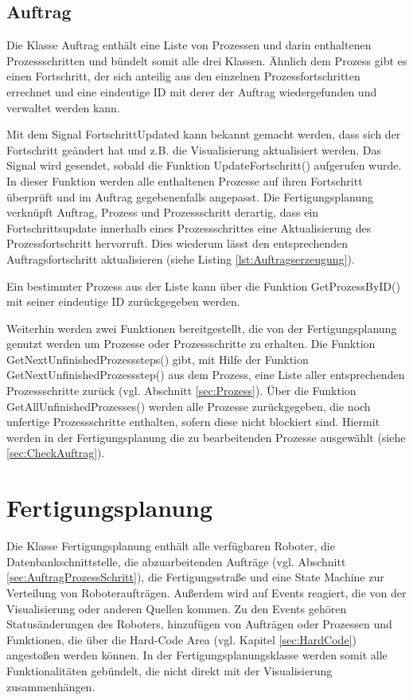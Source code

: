 \subsection{Auftrag}
\label{sec:Auftrag}

Die Klasse Auftrag enthält eine Liste von Prozessen und darin enthaltenen Prozessschritten und bündelt somit alle drei Klassen. Ähnlich dem Prozess gibt es einen Fortschritt, der sich anteilig aus den einzelnen Prozessfortschritten errechnet und eine eindeutige ID mit derer der Auftrag wiedergefunden und verwaltet werden kann. 

Mit dem Signal FortschrittUpdated kann bekannt gemacht werden, dass sich der Fortschritt geändert hat und z.B. die Visualisierung aktualisiert werden. Das Signal wird gesendet, sobald die Funktion UpdateFortschritt() aufgerufen wurde. In dieser Funktion werden alle enthaltenen Prozesse auf ihren Fortschritt überprüft und im Auftrag gegebenenfalls angepasst. Die Fertigungsplanung verknüpft Auftrag, Prozess und Prozessschritt derartig, dass ein Fortschrittsupdate innerhalb eines Prozessschrittes eine Aktualisierung des Prozessfortschritt hervorruft. Dies wiederum lässt den entsprechenden Auftragsfortschritt aktualisieren (siehe Listing \ref{lst:Auftragserzeugung}).

Ein bestimmter Prozess aus der Liste kann über die Funktion GetProzessByID() mit seiner eindeutige ID zurückgegeben werden. 

Weiterhin werden zwei Funktionen bereitgestellt, die von der Fertigungsplanung genutzt werden um Prozesse oder Prozessschritte zu erhalten. Die Funktion GetNextUnfinishedProzesssteps() gibt, mit Hilfe der Funktion GetNextUnfinishedProzessstep() aus dem Prozess, eine Liste aller entsprechenden Prozessschritte zurück (vgl. Abschnitt \ref{sec:Prozess}). Über die Funktion GetAllUnfinishedProzesses() werden alle Prozesse zurückgegeben, die noch unfertige Prozessschritte enthalten, sofern diese nicht blockiert sind. Hiermit werden in der Fertigungsplanung die zu bearbeitenden Prozesse ausgewählt (siehe \ref{sec:CheckAuftrag}).

\section{Fertigungsplanung}
\label{sec:Fertigungsplanung}

Die Klasse Fertigungsplanung enthält alle verfügbaren Roboter, die Datenbankschnittstelle, die abzuarbeitenden Aufträge (vgl. Abschnitt \ref{sec:AuftragProzessSchritt}), die Fertigungsstraße und eine State Machine zur Verteilung von Roboteraufträgen. Außerdem wird auf Events reagiert, die von der Visualisierung oder anderen Quellen kommen. Zu den Events gehören Statusänderungen des Roboters, hinzufügen von Aufträgen oder Prozessen und Funktionen, die über die Hard-Code Area (vgl. Kapitel \ref{sec:HardCode}) angestoßen werden können. 
In der Fertigungsplanungsklasse werden somit alle Funktionalitäten gebündelt, die nicht direkt mit der Visualisierung zusammenhängen. 

